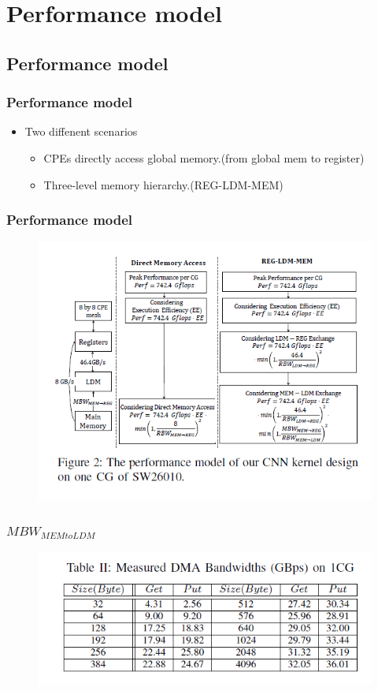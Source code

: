 \section{Performance model}

\subsection{Performance model}
\begin{frame}
    \frametitle{Performance model}
	\begin{itemize}
		\item Two diffenent scenarios
		\begin{itemize}
			\item CPEs directly access global memory.(from global mem to register)  
			\item Three-level memory hierarchy.(REG-LDM-MEM)
		\end{itemize}
	\end{itemize} 
\end{frame}

\begin{frame}
	\frametitle{Performance model}
	\begin{figure}
		\includegraphics[scale=0.5]{figure/performancemodel.PNG}
	\end{figure}
\end{frame}

\begin{frame}
	\frametitle{$MBW_{MEM to LDM}$}
	\begin{figure}
		\includegraphics[scale=0.5]{figure/performancetable.PNG}
	\end{figure}
\end{frame}


	

